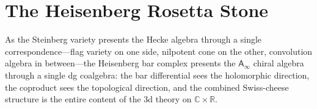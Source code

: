 %

\providecommand{\barB}{\bar{B}}
\providecommand{\cA}{\mathcal{A}}
\providecommand{\cH}{\mathcal{H}}
\providecommand{\SCchtop}{\mathsf{SC}^{\mathrm{ch,top}}}
\providecommand{\Ainf}{\mathsf{A}_{\infty}}
\providecommand{\Eone}{\mathsf{E}_1}
\providecommand{\Einf}{\mathsf{E}_{\infty}}
\providecommand{\Ass}{\mathsf{Ass}}
\providecommand{\FM}{\mathrm{FM}}
\providecommand{\Conf}{C}
\providecommand{\dfib}{d_{\mathrm{fib}}}
\providecommand{\Dg}[1]{D_{#1}}
\providecommand{\dzero}{d_0}
\providecommand{\barBch}{\bar{B}^{\mathrm{ch}}}
\providecommand{\Omegach}{\Omega^{\mathrm{ch}}}
\providecommand{\bC}{\mathbb{C}}
\providecommand{\bR}{\mathbb{R}}
\providecommand{\C}{\mathbb{C}}
\providecommand{\R}{\mathbb{R}}
\providecommand{\Z}{\mathbb{Z}}
\providecommand{\fg}{\mathfrak{g}}
\providecommand{\id}{\mathrm{id}}
\providecommand{\Res}{\operatorname{Res}}
\providecommand{\Ran}{\operatorname{Ran}}
\providecommand{\chirCom}{\mathsf{Com}^{\mathrm{ch}}}
\providecommand{\chirLie}{\mathsf{Lie}^{\mathrm{ch}}}
\providecommand{\Linf}{\mathsf{L}_{\infty}}
\providecommand{\ClaimStatusProvedHere}{\textnormal{[proved here]}}
\providecommand{\ClaimStatusProvedElsewhere}{\textnormal{[proved elsewhere]}}
\providecommand{\ClaimStatusConjectured}{\textnormal{[conjectured]}}
\providecommand{\ClaimStatusHeuristic}{\textnormal{[physical heuristic]}}
\providecommand{\Hom}{\operatorname{Hom}}
\providecommand{\colldiv}[2]{D_{#1#2}}
\providecommand{\LogForm}[2]{\eta_{#1#2}}


\section{The Heisenberg Rosetta Stone}
\label{sec:rosetta-stone}

As the Steinberg variety presents the Hecke algebra through a single
correspondence---flag variety on one side, nilpotent cone on the
other, convolution algebra in between---the Heisenberg bar complex
presents the $\Ainf$ chiral algebra through a single dg coalgebra:
the bar differential sees the holomorphic direction, the coproduct
sees the topological direction, and the combined Swiss-cheese structure
is the entire content of the 3d theory on $\bC \times \bR$.

